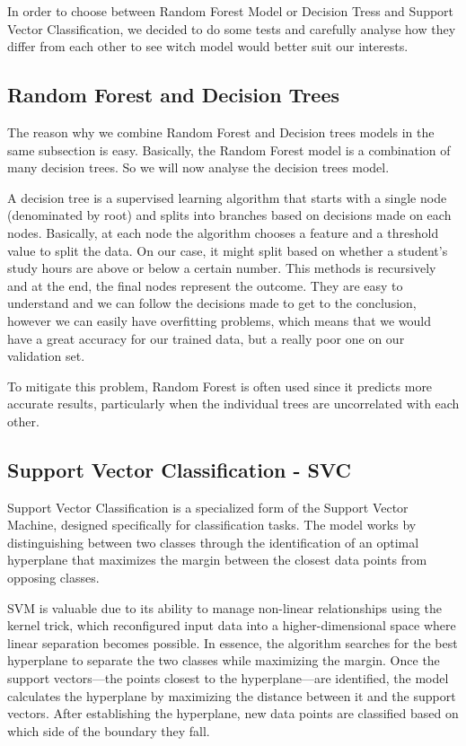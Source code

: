 \documentclass{article}
\begin{document}
In order to choose between Random Forest Model or Decision Tress and Support Vector Classification, we decided to do some tests and carefully analyse how they differ from each other to see witch model would better suit our interests.

\subsection{Random Forest and Decision Trees}

\quad The reason why we combine Random Forest and Decision trees models in the same subsection is easy. Basically, the Random Forest model is a combination of many decision trees. So we will now analyse the decision trees model. 

A decision tree is a supervised learning algorithm that starts with a single node (denominated by root) and splits into branches based on decisions made on each nodes. Basically, at each node the algorithm chooses a feature and a threshold value to split the data. \cite{Randon_Forest} On our case, it might split based on whether a student's study hours are above or below a certain number. This methods is recursively and at the end, the final nodes represent the outcome. They are easy to understand and we can follow the decisions made to get to the conclusion, however we can easily have overfitting problems, which means that we would have a great accuracy for our trained data, but a really poor one on our validation set. \cite{Random_Forest_Library}

To mitigate this problem, Random Forest is often used since it predicts more accurate results, particularly when the individual trees are uncorrelated with each other.

\subsection{Support Vector Classification - SVC}

\quad Support Vector Classification is a specialized form of the Support Vector Machine, designed specifically for classification tasks. The model works by distinguishing between two classes through the identification of an optimal hyperplane that maximizes the margin between the closest data points from opposing classes. \cite{SVM}

SVM is valuable due to its ability to manage non-linear relationships using the kernel trick, which reconfigured input data into a higher-dimensional space where linear separation becomes possible. In essence, the algorithm searches for the best hyperplane to separate the two classes while maximizing the margin. Once the support vectors—the points closest to the hyperplane—are identified, the model calculates the hyperplane by maximizing the distance between it and the support vectors. After establishing the hyperplane, new data points are classified based on which side of the boundary they fall.
\end{document}
